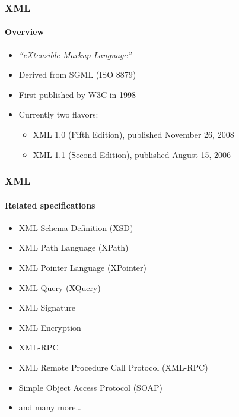 \documentclass[
    alternativetitlepage=bild,
    cornerlogo=hgi_nds_logo2,
    sectionoverview,
]{rubpresentation}
\begin{document}
\begin{frame}[plain]
    \frametitle{XML}
    \framesubtitle{Overview}
    \begin{itemize}
        \item{} \emph{\enquote{eXtensible Markup Language}}\\
        \item{} Derived from SGML (ISO 8879)\\
        \item{} First published by W3C in 1998\\
        \item{} Currently two flavors:
            \begin{itemize}
                \item{} XML 1.0 (Fifth Edition), published November 26, 2008\\
                \item{} XML 1.1 (Second Edition), published August 15, 2006\\
            \end{itemize}
    \end{itemize}
\end{frame}

\begin{frame}[plain]
    \frametitle{XML}
    \framesubtitle{Related specifications}
    \begin{itemize}
        \item{} XML Schema Definition (XSD)\\
        \item{} XML Path Language (XPath)\\
        \item{} XML Pointer Language (XPointer)\\
        \item{} XML Query (XQuery)\\
        \item{} XML Signature\\
        \item{} XML Encryption\\
        \item{} XML-RPC\\
        \item{} XML Remote Procedure Call Protocol (XML-RPC)\\
        \item{} Simple Object Access Protocol (SOAP)
        \item{} and many more\ldots\\
    \end{itemize}
\end{frame}
\end{document}
